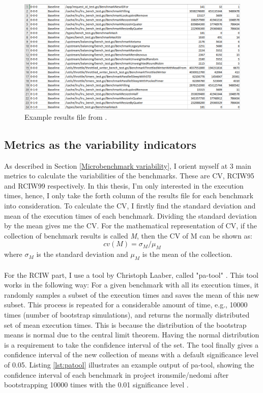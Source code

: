 \documentclass{seal_thesis}
\begin{document}
\begin{figure}[]
	\centering
	\includegraphics[width=\linewidth]{exampleresults}
	\caption{Example results file from \cite{ironsmile/nedomi}.}
	\label{fig:exampleresults}
\end{figure}
 
\subsection{Metrics as the variability indicators}

As described in Section \ref{Microbenchmark variability}, I orient myself at 3 main metrics to calculate the variabilities of the benchmarks. These are CV, RCIW95 and RCIW99 respectively. In this thesis, I'm only interested in the execution times, hence, I only take the forth column of the results file for each benchmark into consideration. To calculate the CV, I firstly find the standard deviation and mean of the execution times of each benchmark. Dividing the standard deviation by the mean gives me the CV. For the mathematical representation of CV, if the collection of benchmark results is called \textit{M}, then the CV of M can be shown as:
\[ cv(M) = \sigma _{M} / \mu _{M} \]
where $\sigma _{M}$ is the standard deviation and $\mu _{M}$ is the mean of the collection.\\
\\
For the RCIW part, I use a tool by Christoph Laaber, called "pa-tool" \cite{patool}. This tool works in the following way: For a given benchmark with all its execution times, it randomly samples a subset of the execution times and saves the mean of this new subset. This process is repeated for a considerable amount of time, e.g., 10000 times (number of bootstrap simulations), and returns the normally distributed set of mean execution times. This is because the distribution of the bootstrap means is normal due to the central limit theorem. Having the normal distribution is a requirement to take the confidence interval of the set. The tool finally gives a confidence interval of the new collection of means with a default significance level of 0.05. Listing \ref{lst:patool} illustrates an example output of pa-tool, showing the confidence interval of each benchmark in project ironsmile/nedomi after bootstrapping 10000 times with the 0.01 significance level \cite{ironsmile/nedomi}.
\end{document}
